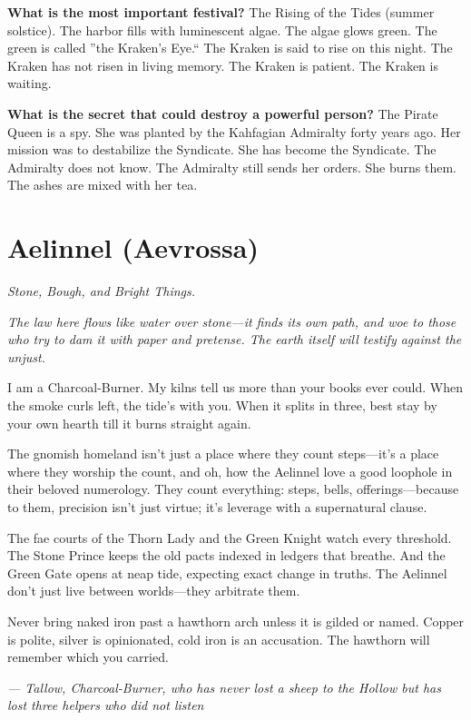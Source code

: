 \begin{almanac}
\textbf{What is the most important festival?} The Rising of the Tides (summer solstice). The harbor fills with luminescent algae. The algae glows green. The green is called ''the Kraken's Eye.`` The Kraken is said to rise on this night. The Kraken has not risen in living memory. The Kraken is patient. The Kraken is waiting.

\textbf{What is the secret that could destroy a powerful person?} The Pirate Queen is a spy. She was planted by the Kahfagian Admiralty forty years ago. Her mission was to destabilize the Syndicate. She has become the Syndicate. The Admiralty does not know. The Admiralty still sends her orders. She burns them. The ashes are mixed with her tea.
\end{almanac}

\newpage

\newpage

\chapter{Aelinnel (Aevrossa)}
\emph{Stone, Bough, and Bright Things.}

\noindent
{\Large
\textit{The law here flows like water over stone---it finds its own path, and woe to those who try to dam it with paper and pretense. The earth itself will testify against the unjust.}

\vspace{0.5em}

I am a Charcoal-Burner. My kilns tell us more than your books ever could. When the smoke curls left, the tide's with you. When it splits in three, best stay by your own hearth till it burns straight again.

\vspace{0.5em}

The gnomish homeland isn't just a place where they count steps---it's a place where they worship the count, and oh, how the Aelinnel love a good loophole in their beloved numerology. They count everything: steps, bells, offerings---because to them, precision isn't just virtue; it's leverage with a supernatural clause.

\vspace{0.5em}

The fae courts of the Thorn Lady and the Green Knight watch every threshold. The Stone Prince keeps the old pacts indexed in ledgers that breathe. And the Green Gate opens at neap tide, expecting exact change in truths. The Aelinnel don't just live between worlds---they arbitrate them.

\vspace{0.5em}

Never bring naked iron past a hawthorn arch unless it is gilded or named. Copper is polite, silver is opinionated, cold iron is an accusation. The hawthorn will remember which you carried.

\vspace{1em}

\noindent\textit{--- Tallow, Charcoal-Burner, who has never lost a sheep to the Hollow but has lost three helpers who did not listen}
}

